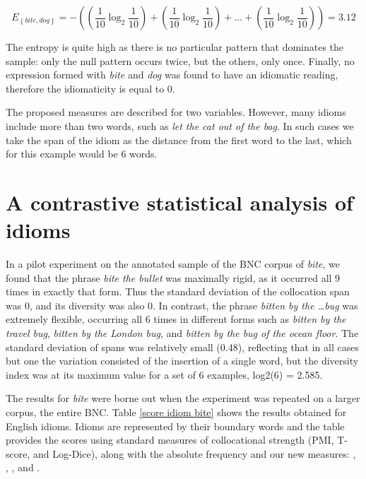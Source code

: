\documentclass[output=paper]{langsci/langscibook}
\begin{document}
\begin{equation*}
E_{\left\{\mathit{bite},\mathit{dog}\right\}}=-\left(\left(\frac
1{10}\log _2\frac 1{10}\right)+\left(\frac 1{10}\log _2\frac
1{10}\right)+…+\left(\frac 1{10}\log _2\frac 1{10}\right)\right)=3.12
\end{equation*}


The entropy is quite high as there is no particular pattern that
dominates the sample: only the null pattern occurs twice, but the
others, only once. Finally, no expression formed with \textit{bite} and \textit{dog}
was found to have an idiomatic reading, therefore the idiomaticity is
equal to 0.



The proposed measures are described for two variables. However, many
idioms include more than two words, such as \textit{let the cat out of the
bag}. In such cases we take the span of the idiom as the distance from
the first word to the last, which for this example would be 6 words. 

\section{A contrastive statistical analysis of idioms}

In a pilot experiment on the annotated sample of the BNC corpus of
\textit{bite}, we found that the phrase \textit{bite the bullet} was maximally rigid,
as it occurred all 9 times in exactly that form. Thus the standard
deviation of the collocation span was 0, and its diversity was also 0.
In contrast, the phrase \textit{bitten by the \dots bug} was extremely flexible,
occurring all 6 times in different forms such as \textit{bitten by the travel
bug}, \textit{bitten by the London bug}, and \textit{bitten by the bug of the ocean
floor}. The standard deviation of spans was relatively small (0.48),
reflecting that in all cases but one the variation consisted of the
insertion of a single word, but the diversity index was at its maximum
value for a set of 6 examples, log2(6) = 2.585. 



The results for \textit{bite} were borne out when the experiment was repeated
on a larger corpus, the entire BNC. Table \ref{score idiom bite} shows the results obtained
for English idioms. Idioms are represented by their boundary words and
the table provides the scores using standard measures of collocational
strength (PMI, T-score, and Log-Dice), along with the absolute
frequency and our new measures: , , , and
.
\end{document}
